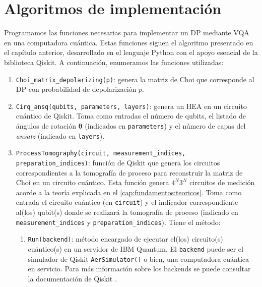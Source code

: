\documentclass[letterpaper,12pt]{thesisECFM}
\theoremstyle{plain}
\theoremstyle{definition}
\theoremstyle{definition}
\theoremstyle{remark}
\newcommand{\1}{\mathbb{1}}
\begin{document}
\section{Algoritmos de implementación} %
\label{sec:algoritmos_vqa}
Programamos las funciones necesarias para implementar un DP mediante VQA
en una computadora cuántica. Estas funciones siguen el algoritmo presentado en
el capítulo anterior, desarrollado en el lenguaje Python con el apoyo esencial
de la biblioteca Qiskit. A continuación, enumeramos las funciones utilizadas: 
\begin{enumerate}
    \item \texttt{Choi\_matrix\_depolarizing(p)}: genera la matriz de Choi que
corresponde al DP con probabilidad de depolarización $p$.

    \item \texttt{Cirq\_ansq(qubits, parameters, layers)}: genera un HEA en un circuito cuántico de Qiskit. Toma como entradas el número de qubits, el listado de ángulos de rotación $\bm{\theta}$ (indicados en \texttt{parameters}) y el número de capas del \textit{ansatz} (indicado en \texttt{layers}).
    
    \item \texttt{ProcessTomography(circuit, measurement\_indices,
preparation\_indices)}: función de Qiskit que genera los circuitos
correspondientes a la tomografía de proceso para reconstruir la matriz de Choi
en un circuito cuántico. Esta función genera $4^N3^N$ circuitos de medición
acorde a la teoría explicada en el \autoref{cap:fundamentos:teoricos}. Toma como entrada el circuito
cuántico (en  \texttt{circuit})  y el indicador correspondiente al(los)
qubit(s) donde se realizará la tomografía de proceso (indicado en
\texttt{measurement\_indices} y \texttt{preparation\_indices}). Tiene el
método: 
    \begin{enumerate}
	\item \texttt{Run(backend)}: método encargado de ejecutar el(los)
circuito(s) cuántico(s) en un servidor de IBM Quantum. El
\texttt{backend} puede ser el simulador de Qiskit  \texttt{AerSimulator()} o
bien, una computadora cuántica en servicio. Para más información sobre los backends se puede consultar la documentación de Qiskit \cite{Qiskit_documentation}. 
    \end{enumerate}


\end{enumerate}
\end{document}
